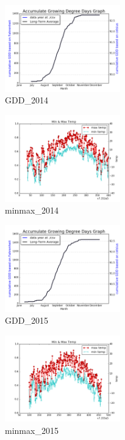 \documentclass[DIV=calc, paper=a4, fontsize=11pt, twocolumn]{scrartcl}
\begin{document}
\begin{figure}[h!]
	\centering
	\includegraphics[width=50mm]{../output/50430_2014_gdd.png}
    \caption{GDD_2014}
	\label{fig:method13}
\end{figure}
\begin{figure}[h!]
	\centering
	\includegraphics[width=50mm]{../output/50430_2014_minmax.png}
    \caption{minmax_2014}
	\label{fig:method14}
\end{figure}
\begin{figure}[h!]
	\centering
	\includegraphics[width=50mm]{../output/50430_2015_gdd.png}
    \caption{GDD_2015}
	\label{fig:method15}
\end{figure}


\begin{figure}[h!]
	\centering
	\includegraphics[width=50mm]{../output/50430_2015_minmax.png}
	    \caption{minmax_2015}
	\label{fig:method16}
\end{figure}
\end{document}
